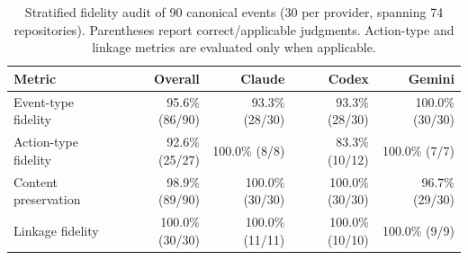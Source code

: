\begin{table}[t]
\centering
\small
\begin{tabular}{lrrrr}
\toprule
Metric & Overall & Claude & Codex & Gemini \\
\midrule
Event-type fidelity & 95.6\% (86/90) & 93.3\% (28/30) & 93.3\% (28/30) & 100.0\% (30/30) \\
Action-type fidelity & 92.6\% (25/27) & 100.0\% (8/8) & 83.3\% (10/12) & 100.0\% (7/7) \\
Content preservation & 98.9\% (89/90) & 100.0\% (30/30) & 100.0\% (30/30) & 96.7\% (29/30) \\
Linkage fidelity & 100.0\% (30/30) & 100.0\% (11/11) & 100.0\% (10/10) & 100.0\% (9/9) \\
\bottomrule
\end{tabular}
\caption{Stratified fidelity audit of 90 canonical events (30 per provider, spanning 74 repositories). Parentheses report correct/applicable judgments. Action-type and linkage metrics are evaluated only when applicable.}
\label{tab:fidelity}
\end{table}
